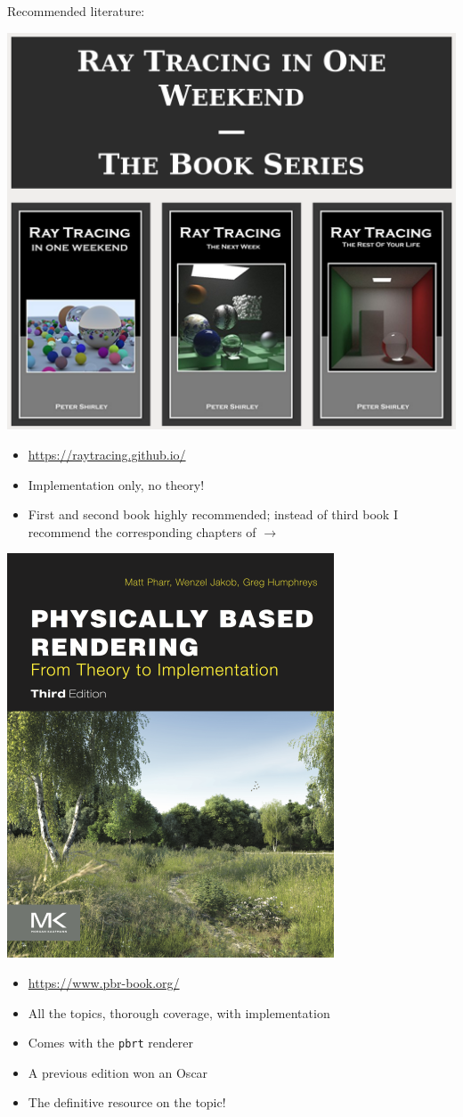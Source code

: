 \documentclass[utf8,stillsansserifmath,fleqn,t]{beamer}
\newcommand{\code}[1]{\texttt{#1}}
\begin{document}
\begin{frame}
\frametitle{\insertsection}
Recommended literature:\\[-1ex]
\begin{minipage}[t]{.48\textwidth}
\centerline{\includegraphics[width=.73\textwidth]{./fig/rtiow.png}}
\footnotesize
\begin{itemize}
\item \url{https://raytracing.github.io/}
\item Implementation only, no theory!
\item First and second book highly recommended; instead of third book I recommend the
corresponding chapters of $\rightarrow$
\end{itemize}
\end{minipage}\hfill
\begin{minipage}[t]{.48\textwidth}
\centerline{\includegraphics[width=.6\textwidth]{./fig/pbr.png}}
\footnotesize
\begin{itemize}
\item \url{https://www.pbr-book.org/}
\item All the topics, thorough coverage, with implementation
\item Comes with the \code{pbrt} renderer
\item A previous edition won an Oscar
\item The definitive resource on the topic!
\end{itemize}
\end{minipage}
\end{frame}
\end{document}
